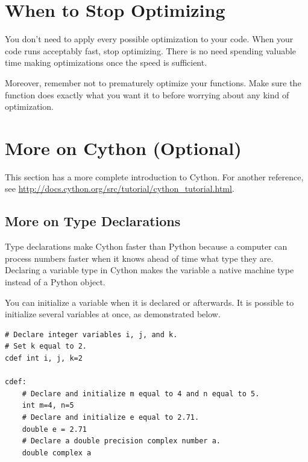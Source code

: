 \section*{When to Stop Optimizing}
You don't need to apply every possible optimization to your code.
When your code runs acceptably fast, stop optimizing. There is no need spending valuable time making optimizations once the speed is sufficient. 

Moreover, remember not to prematurely optimize your functions. Make sure the function does exactly what you want it to before worrying about any kind of optimization.

























      
\section*{More on Cython (Optional)}
This section has a more complete introduction to Cython. 
For another reference, see \url{http://docs.cython.org/src/tutorial/cython_tutorial.html}.

\subsection*{More on Type Declarations}
Type declarations make Cython faster than Python because a computer can process numbers faster when it knows ahead of time what type they are.
Declaring a variable type in Cython makes the variable a native machine type instead of a Python object.

You can initialize a variable when it is declared or afterwards.
It is possible to initialize several variables at once, as demonstrated below.

\begin{lstlisting}
# Declare integer variables i, j, and k.
# Set k equal to 2.
cdef int i, j, k=2

cdef:
    # Declare and initialize m equal to 4 and n equal to 5.
    int m=4, n=5
    # Declare and initialize e equal to 2.71.
    double e = 2.71
    # Declare a double precision complex number a.
    double complex a
\end{lstlisting}

